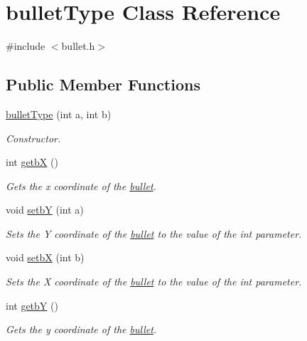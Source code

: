 \hypertarget{classbulletType}{
\section{bulletType Class Reference}
\label{classbulletType}
}


{\ttfamily \#include $<$bullet.h$>$}\subsection*{Public Member Functions}
\begin{DoxyCompactItemize}
\item 
\hyperlink{classbulletType_ad854048f38d7514caa09af4ab034837b}{bulletType} (int a, int b)
\begin{DoxyCompactList}\small\item\em Constructor. \item\end{DoxyCompactList}\item 
int \hyperlink{classbulletType_a3a40c67dcf6d3b6dc91e6fa7800cdaf4}{getbX} ()
\begin{DoxyCompactList}\small\item\em Gets the x coordinate of the \hyperlink{classbullet}{bullet}. \item\end{DoxyCompactList}\item 
void \hyperlink{classbulletType_a623f1eeb1381c512708efccafbb3c192}{setbY} (int a)
\begin{DoxyCompactList}\small\item\em Sets the Y coordinate of the \hyperlink{classbullet}{bullet} to the value of the int parameter. \item\end{DoxyCompactList}\item 
void \hyperlink{classbulletType_af69e22a00c81d5610cfb121dabf25b2b}{setbX} (int b)
\begin{DoxyCompactList}\small\item\em Sets the X coordinate of the \hyperlink{classbullet}{bullet} to the value of the int parameter. \item\end{DoxyCompactList}\item 
int \hyperlink{classbulletType_a6787ea4992f2fead3ee07e9216b06d4e}{getbY} ()
\begin{DoxyCompactList}\small\item\em Gets the y coordinate of the \hyperlink{classbullet}{bullet}. \item\end{DoxyCompactList}\end{DoxyCompactItemize}
